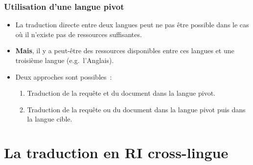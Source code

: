 \documentclass[11pt,aspectratio=43,dvipsnames,table]{beamer}
\begin{document}
\begin{frame}
    \frametitle{Utilisation d'une langue pivot}
    \begin{itemize} \itemsep10pt
        \item La traduction directe entre deux langues peut ne pas être possible
              dans le cas où il n'existe pas de ressources suffisantes.
        \item \textbf{Mais}, il y a peut-être des ressources disponibles entre 
              ces langues et une troisième langue (e.g.~l'Anglais).
        \item Deux approches sont possibles~:
        \begin{enumerate}
            \item Traduction de la requête et du document dans la langue pivot.
            \item Traduction de la requête ou du document dans la langue pivot 
                  puis dans la langue cible.
        \end{enumerate}
    \end{itemize}
\end{frame}


\section{La traduction en RI cross-lingue}
\end{document}
